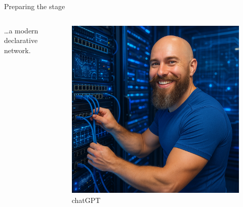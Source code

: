 \documentclass[aspectratio=169]{beamer}
\begin{document}
\begin{frame}{Preparing the stage}

  \begin{columns}
    \begin{column}{0.4\textwidth}
      \dots a modern declarative network.
    \end{column}
    \begin{column}{0.4\textwidth}
      \begin{figure}
        \includegraphics[height = 0.7\textheight]{images/urs_future_network.png}
        \caption{\footnotesize chatGPT}
      \end{figure}
    \end{column}
  \end{columns}

\end{frame}
\end{document}
